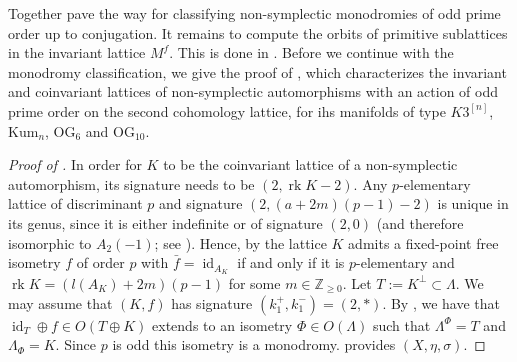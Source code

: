 \documentclass{amsart}
\theoremstyle{definition}
\theoremstyle{plain}
\DeclareMathOperator{\rk}{rk}
\DeclareMathOperator{\id}{id}
\newcommand{\ZZ}{\mathbb{Z}}
\newcommand{\kumn}{\mathrm{Kum}_n}
\newcommand{\hskn}{K3^{\left[n\right]}}
\begin{document}
Together 
pave the way for classifying non-symplectic monodromies of odd prime order up to conjugation.
It remains to compute the orbits of primitive sublattices in the invariant lattice $M^f$.
This is done in  . Before we continue with the monodromy classification,
we give the proof of  , which characterizes the invariant and coinvariant
lattices of non-symplectic automorphisms with an action of odd prime order on the second cohomology lattice, for ihs manifolds of type $\hskn$, $\kumn$, OG$_6$ and OG$_{10}$.


\begin{proof}[Proof of ]
In order for $K$ to be the coinvariant lattice of a non-symplectic automorphism, its signature needs to be $(2,\rk K -2)$.
Any $p$-elementary lattice of discriminant $p$ and signature $(2,(a+2m)(p-1)-2)$ is unique
in its genus, since it is either indefinite or of signature
$(2,0)$ (and therefore isomorphic to $A_2(-1)$; see
\cite[Table 15.1]{conway_sloane}). Hence, by
 the lattice $K$
admits a fixed-point free isometry $f$ of order $p$ with
$\bar f = \id_{A_K}$ if and only if it is $p$-elementary
and $\rk K = (l(A_K) + 2m)(p-1)$ for some $m \in \ZZ_{\geq 0}$. Let $T := K^\perp \subset \Lambda$. 
We may assume that $(K,f)$ has signature $(k_1^+,k_1^-)=(2,\ast)$.
By \cite[Cor.\ 1.5.2]{nikulin},
we have that $\id_T \oplus f \in O(T \oplus K)$ extends to
an isometry $\Phi \in O(\Lambda)$ such that $\Lambda^\Phi = T$ and $\Lambda_\Phi = K$. 
Since $p$ is odd this isometry is a monodromy.
 provides $(X,\eta,\sigma)$.
\end{proof}
\end{document}
